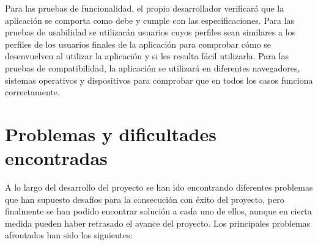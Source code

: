  Para las pruebas de funcionalidad, el propio desarrollador verificará que la aplicación se comporta como debe y cumple con las especificaciones. Para las pruebas de usabilidad se utilizarán usuarios cuyos perfiles sean similares a los perfiles de los usuarios finales de la aplicación para comprobar cómo se desenvuelven al utilizar la aplicación y si les resulta fácil utilizarla. Para las pruebas de compatibilidad, la aplicación se utilizará en diferentes navegadores, sistemas operativos y dispositivos para comprobar que en todos los casos funciona correctamente. 

\section{Problemas y dificultades encontradas}

A lo largo del desarrollo del proyecto se han ido encontrando diferentes problemas que han supuesto desafíos para la consecución con éxito del proyecto, pero finalmente se han podido encontrar solución a cada uno de ellos, aunque en cierta medida pueden haber retrasado el avance del proyecto. Los principales problemas afrontados han sido los siguientes:
